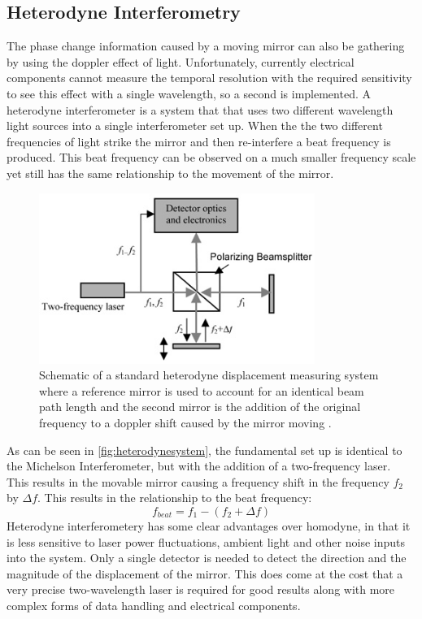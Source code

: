 \documentclass[12pt,a4paper,oneside]{report}
\begin{document}
	\subsection{Heterodyne Interferometry}
The phase change information caused by a moving mirror can also be gathering by using the doppler effect of light. Unfortunately, currently electrical components cannot measure the temporal resolution with the required sensitivity to see this effect with a single wavelength, so a second is implemented. A heterodyne interferometer is a system that that uses two different wavelength light sources into a single interferometer set up. When the the two different frequencies of light strike the mirror and then re-interfere a beat frequency is produced. This beat frequency can be observed on a much smaller frequency scale yet still has the same relationship to the movement of the mirror.

\begin{figure}[H]
\includegraphics[width=0.8\textwidth, center,angle=0]{Images/heterodyne_system.jpg}
\caption{Schematic of a standard heterodyne displacement measuring system where a reference mirror is used to account for an identical beam path length and the second mirror is the addition of the original frequency to a doppler shift caused by the mirror moving \cite{HeterodyneInterferometer}.}
\label{fig:heterodynesystem}
\end{figure}

As can be seen in \autoref{fig:heterodynesystem}, the fundamental set up is identical to the Michelson Interferometer, but with the addition of a two-frequency laser. This results in the movable mirror causing a frequency shift in the frequency $f_{2}$ by $\Delta f$. This results in the relationship to the beat frequency:
\begin{equation}
f_{beat} = f_{1} - (f_{2} + \Delta f)
	\label{eq:dopplershift}
\end{equation}
Heterodyne interferometery has some clear advantages over homodyne, in that it is less sensitive to laser power fluctuations, ambient light and other noise inputs into the system. Only a single detector is needed to detect the direction and the magnitude of the displacement of the mirror. This does come at the cost that a very precise two-wavelength laser is required for good results along with more complex forms of data handling and electrical components.
    
\end{document}

